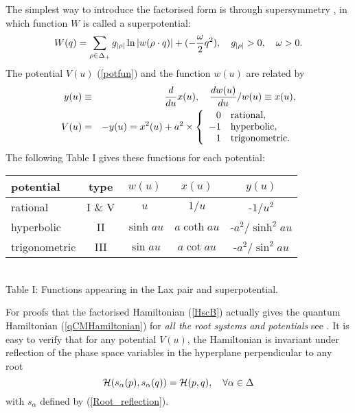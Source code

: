 \documentclass[a4paper,12pt]{article}
\begin{document}
The simplest way to introduce the factorised form is through
supersymmetry \cite{bms,FredMend}, in which  function   \(W\) is
called a superpotential:
\begin{equation}
   W(q)=\sum_{\rho\in\Delta_+}g_{|\rho|}\ln|w(\rho\cdot q)|+
   (-{\omega\over2}q^2),
   \quad g_{|\rho|}>0,\quad \omega>0.
   \label{suppot}
\end{equation}
The potential \(V(u)\) (\ref{potfun}) and the function \(w(u)\) are related
by
\begin{eqnarray}
 y(u)&\equiv& {d\over {du}} x(u),\quad
   {dw(u)\over {du}}/w(u)\equiv x(u),\label{hdef}\\
 V(u)&=&-y(u)=x^2(u)+a^2\times\left\{
   \begin{array}{rl}
      0& \mbox{rational},\\
      -1& \mbox{hyperbolic},\\
      1& \mbox{trigonometric}.
   \end{array}\right.
   \label{Vxrel}
\end{eqnarray}
The following Table I gives these functions for each potential:
\begin{center}
  \begin{tabular}{|lc|c|c|c|}
     \hline
      potential& type&\(w(u)\) & \(x(u)\) & \(y(u)\) \\
     \hline
     rational & I \& V&\(u\) & \(1/u\) & -\(1/u^2\) \\
     \hline
     hyperbolic & II&\(\sinh au\) & \(a\coth au\) & -\(a^2/\sinh^2 au\) \\
     \hline
     trigonometric &III& \(\sin au\) & \(a\cot au\) & -\(a^2/\sin^2 au\) \\
     \hline
  \end{tabular}\\
\bigskip
 Table I: Functions appearing in the Lax pair and superpotential.
\end{center}
For proofs that the factorised Hamiltonian (\ref{HscB}) actually gives
the quantum Hamiltonian (\ref{qCMHamiltonian}) for
{\em all the root systems and
potentials\/} see \cite{OP2,OP3,bms}. It is easy to
verify that for any potential
\(V(u)\), the Hamiltonian is invariant under reflection of the phase space
variables in the hyperplane perpendicular to any root
\begin{equation}
  {\cal H}(s_{\alpha}(p),s_{\alpha}(q))={\cal H}(p,q), \quad
   \forall\alpha\in\Delta
  \label{HamCoxinv}
\end{equation}
with \(s_{\alpha}\) defined by (\ref{Root_reflection}).
\end{document}
